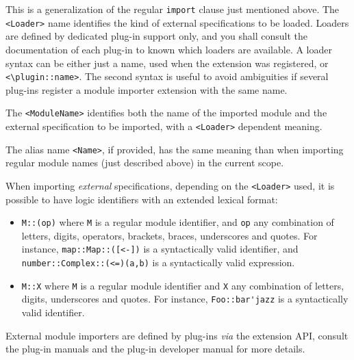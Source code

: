 This is a generalization of the regular \acsl \lstinline[language=ACSL]|import|
clause just mentioned above. The \verb+<Loader>+ name identifies the kind of
external specifications to be loaded. Loaders are defined by dedicated plug-in
support only, and you shall consult the documentation of each plug-in to known
which loaders are available. A loader syntax can be either just a name, used
when the extension was registered, or \verb+<\plugin::name>+. The second syntax
is useful to avoid ambiguities if several plug-ins register a module importer
extension with the same name.

The \verb+<ModuleName>+ identifies both the name of the imported module and the
external specification to be imported, with a \verb+<Loader>+ dependent meaning.

The alias name \verb+<Name>+, if provided, has the same meaning than when
importing regular module names (just described above) in the current scope.

When importing \emph{external} specifications, depending on the \verb+<Loader>+
used, it is possible to have logic identifiers with an extended lexical format:
\begin{itemize}
\item \verb+M::(op)+ where \verb+M+ is a regular module identifier, and
  \verb+op+ any combination of letters, digits, operators, brackets, braces,
  underscores and quotes. For instance, \verb+map::Map::([<-])+ is a syntactically
  valid identifier, and \verb+number::Complex::(<=)(a,b)+ is a syntactically valid
  expression.
\item \verb+M::X+ where \verb+M+ is a regular module identifier and
  \verb+X+ any combination of letters, digits, underscores and quotes.
  For instance, \verb+Foo::bar'jazz+ is a syntactically valid identifier.
\end{itemize}

External module importers are defined by plug-ins \textit{via} the extension API,
consult the plug-in manuals and the plug-in developer manual for more details.

